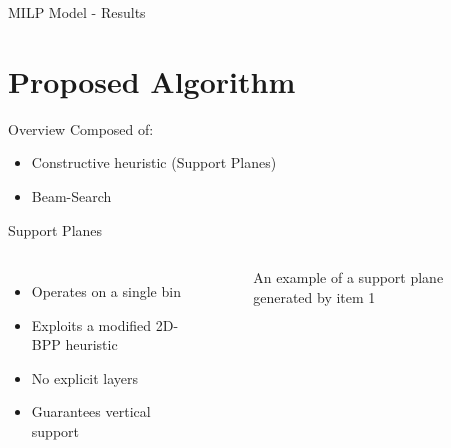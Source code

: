 \documentclass{beamer}
\begin{document}
    \begin{frame}{MILP Model - Results}
        
    \end{frame}

    \section{Proposed Algorithm}
    \begin{frame}{Overview}
        Composed of:
        \begin{itemize}
            \item Constructive heuristic (Support Planes)
            \item Beam-Search
        \end{itemize}
    \end{frame}
    \begin{frame}{Support Planes}
        \begin{columns}[onlytextwidth,T]
            \column{\dimexpr\linewidth-65mm-5mm}
            \begin{itemize}
                \item Operates on a single bin
                \item Exploits a modified 2D-BPP heuristic
                \item No explicit layers
                \item Guarantees vertical support
            \end{itemize}
            \column{65mm}
                \begin{figure}[h]
                    \resizebox*{\columnwidth}{!}{%
                    
                    }
                    \caption*{An example of a support plane generated by item 1}
                    \label{fig:heur_scheme}
                \end{figure}
            \end{columns}
    \end{frame}
    
\end{document}

